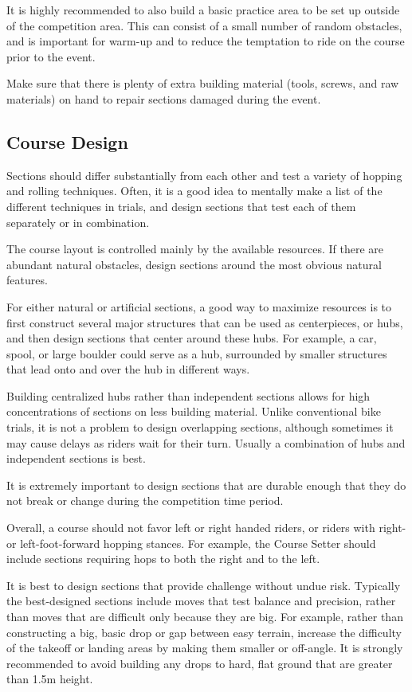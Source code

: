 It is highly recommended to also build a basic practice area to be set up outside of the competition area. 
This can consist of a small number of random obstacles, and is important for warm-up and to reduce the temptation to ride on the course prior to the event.

Make sure that there is plenty of extra building material (tools, screws, and raw materials) on hand to repair sections damaged during the event.

\subsection{Course Design}
Sections should differ substantially from each other and test a variety of hopping and rolling techniques. 
Often, it is a good idea to mentally make a list of the different techniques in trials, and design sections that test each of them separately or in combination.

The course layout is controlled mainly by the available resources.
If there are abundant natural obstacles, design sections around the most obvious natural features.

For either natural or artificial sections, a good way to maximize resources is to first construct several major structures that can be used as centerpieces, or hubs, and then design sections that center around these hubs. 
For example, a car, spool, or large boulder could serve as a hub, surrounded by smaller structures that lead onto and over the hub in different ways.

Building centralized hubs rather than independent sections allows for high concentrations of sections on less building material.
Unlike conventional bike trials, it is not a problem to design overlapping sections, although sometimes it may cause delays as riders wait for their turn. 
Usually a combination of hubs and independent sections is best.

It is extremely important to design sections that are durable enough that they do not break or change during the competition time period.

Overall, a course should not favor left or right handed riders, or riders with right- or left-foot-forward hopping stances.
For example, the Course Setter should include sections requiring hops to both the right and to the left.

It is best to design sections that provide challenge without undue risk. 
Typically the best-designed sections include moves that test balance and precision, rather than moves that are difficult only because they are big. 
For example, rather than constructing a big, basic drop or gap between easy terrain, increase the difficulty of the takeoff or landing areas by making them smaller or off-angle. 
It is strongly recommended to avoid building any drops to hard, flat ground that are greater than 1.5m height.

